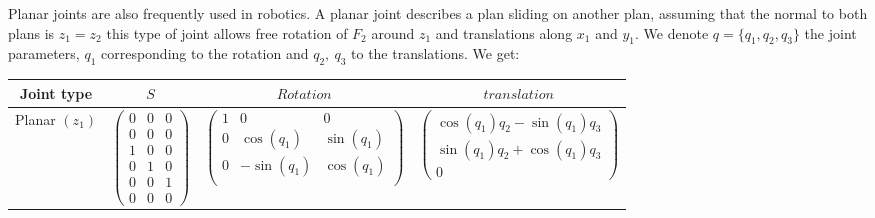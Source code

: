 Planar joints are also frequently used in robotics.
A planar joint describes a plan sliding on another plan, assuming that the normal to both plans is $z_1 = z_2$ this type of joint allows free rotation of $F_2$ around $z_1$ and translations along $x_1$ and $y_1$. We denote $q = \{q_1, q_2, q_3\}$ the joint parameters, $q_1$ corresponding to the rotation and $q_2,\ q_3$ to the translations. We get:

\begin{table} [ht]
\centering
\begin{tabular}{cccc}
  \toprule
  Joint type & $S$ & $Rotation$ & $translation$ \\
  \midrule
  Planar $(z_1)$
  &
  $\begin{pmatrix}
    0 & 0 & 0 \\ 0 & 0 & 0 \\ 1 & 0 & 0 \\ 0 & 1 & 0 \\ 0 & 0 & 1 \\ 0 & 0 & 0
  \end{pmatrix}$
  &
  $\begin{pmatrix}
    1 & 0 & 0 \\
    0 & \cos(q_1) & \sin(q_1) \\
    0 & -\sin(q_1) & \cos(q_1) \\
  \end{pmatrix}$
  &
  $\begin{pmatrix}
    \cos(q_1)q_2 - \sin(q_1)q_3 \\ \sin(q_1)q_2 + \cos(q_1)q_3 \\ 0
  \end{pmatrix}$
  \\
  \bottomrule
\end{tabular}
\end{table}

